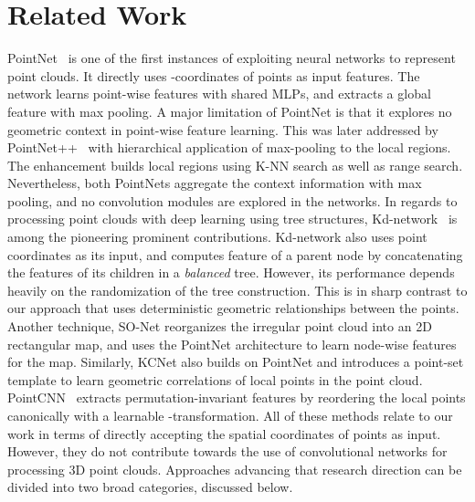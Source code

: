 \documentclass[10pt,twocolumn,letterpaper]{article}
\begin{document}
\section{Related Work}
PointNet~\cite{qi2017pointnet} is one of the first instances of exploiting neural networks to represent point clouds. It directly uses -coordinates of points as input features. The network learns point-wise features with shared MLPs, and extracts a global feature with max pooling. A major limitation of PointNet is that it explores no geometric context in point-wise feature learning. This was later addressed by PointNet++~\cite{qi2017pointnetplusplus} with hierarchical application of max-pooling to the local regions.  The enhancement builds local regions  using K-NN search as well as range search. Nevertheless, both PointNets \cite{qi2017pointnet,qi2017pointnetplusplus} aggregate the  context information with max pooling, and no convolution modules are explored in the networks. 
In regards to processing point clouds with deep learning  using tree structures, Kd-network~\cite{klokov2017escape} is among the pioneering prominent contributions. Kd-network also uses point coordinates as its input, and computes feature of a parent node by concatenating the features of its children in a \emph{balanced} tree. However, its performance depends heavily on the randomization of the tree construction. This is in sharp contrast to our approach that uses deterministic geometric relationships between the points. 
Another technique, SO-Net \cite{li2018so} reorganizes the irregular point cloud into an  2D rectangular map, and uses the PointNet architecture to learn
node-wise features for the map. Similarly, KCNet \cite{shen2018mining} also builds on PointNet and 
introduces a point-set template to learn geometric correlations of local points in the point cloud.  PointCNN~\cite{li2018pointcnn} extracts permutation-invariant features by reordering the local points canonically with a learnable -transformation. 
All of these methods relate to our work in terms of directly accepting the spatial coordinates of points as  input. However, they do not contribute towards the use of  convolutional networks for processing 3D point clouds. Approaches advancing that research direction can be divided into two broad categories, discussed below.  




\vspace{-2mm}
\end{document}

